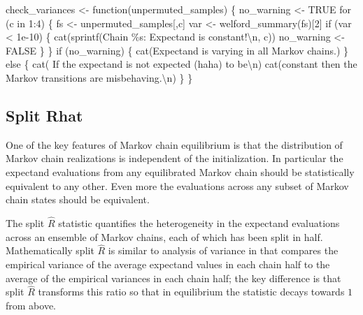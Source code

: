 \documentclass[
  letterpaper,
  DIV=11,
  numbers=noendperiod]{scrartcl}
\newenvironment{Shaded}{\begin{snugshade}}{\end{snugshade}}
\newcommand{\ConstantTok}[1]{\textcolor[rgb]{0.56,0.35,0.01}{#1}}
\newcommand{\ControlFlowTok}[1]{\textcolor[rgb]{0.00,0.23,0.31}{#1}}
\newcommand{\DecValTok}[1]{\textcolor[rgb]{0.68,0.00,0.00}{#1}}
\newcommand{\FloatTok}[1]{\textcolor[rgb]{0.68,0.00,0.00}{#1}}
\newcommand{\FunctionTok}[1]{\textcolor[rgb]{0.28,0.35,0.67}{#1}}
\newcommand{\NormalTok}[1]{\textcolor[rgb]{0.00,0.23,0.31}{#1}}
\newcommand{\OtherTok}[1]{\textcolor[rgb]{0.00,0.23,0.31}{#1}}
\newcommand{\SpecialCharTok}[1]{\textcolor[rgb]{0.37,0.37,0.37}{#1}}
\newcommand{\StringTok}[1]{\textcolor[rgb]{0.13,0.47,0.30}{#1}}
\begin{document}
\begin{Shaded}
\begin{Highlighting}[]
\NormalTok{check\_variances }\OtherTok{\textless{}{-}} \ControlFlowTok{function}\NormalTok{(unpermuted\_samples) \{}
\NormalTok{  no\_warning }\OtherTok{\textless{}{-}} \ConstantTok{TRUE}
  \ControlFlowTok{for}\NormalTok{ (c }\ControlFlowTok{in} \DecValTok{1}\SpecialCharTok{:}\DecValTok{4}\NormalTok{) \{}
\NormalTok{    fs }\OtherTok{\textless{}{-}}\NormalTok{ unpermuted\_samples[,c]}
\NormalTok{    var }\OtherTok{\textless{}{-}} \FunctionTok{welford\_summary}\NormalTok{(fs)[}\DecValTok{2}\NormalTok{]}
    \ControlFlowTok{if}\NormalTok{ (var }\SpecialCharTok{\textless{}} \FloatTok{1e{-}10}\NormalTok{) \{}
      \FunctionTok{cat}\NormalTok{(}\FunctionTok{sprintf}\NormalTok{(}\StringTok{\textquotesingle{}Chain \%s: Expectand is constant!}\SpecialCharTok{\textbackslash{}n}\StringTok{\textquotesingle{}}\NormalTok{, c))}
\NormalTok{      no\_warning }\OtherTok{\textless{}{-}} \ConstantTok{FALSE}
\NormalTok{    \}}
\NormalTok{  \}}
  \ControlFlowTok{if}\NormalTok{ (no\_warning) \{}
    \FunctionTok{cat}\NormalTok{(}\StringTok{\textquotesingle{}Expectand is varying in all Markov chains.\textquotesingle{}}\NormalTok{)}
\NormalTok{  \} }\ControlFlowTok{else}\NormalTok{ \{}
    \FunctionTok{cat}\NormalTok{(}\StringTok{\textquotesingle{}  If the expectand is not expected (haha) to be}\SpecialCharTok{\textbackslash{}n}\StringTok{\textquotesingle{}}\NormalTok{)}
    \FunctionTok{cat}\NormalTok{(}\StringTok{\textquotesingle{}constant then the Markov transitions are misbehaving.}\SpecialCharTok{\textbackslash{}n}\StringTok{\textquotesingle{}}\NormalTok{)}
\NormalTok{  \}}
\NormalTok{\}}
\end{Highlighting}
\end{Shaded}

\hypertarget{split-rhat}{%
\subsection{Split Rhat}\label{split-rhat}}

One of the key features of Markov chain equilibrium is that the
distribution of Markov chain realizations is independent of the
initialization. In particular the expectand evaluations from any
equilibrated Markov chain should be statistically equivalent to any
other. Even more the evaluations across any subset of Markov chain
states should be equivalent.

The split \(\hat{R}\) statistic quantifies the heterogeneity in the
expectand evaluations across an ensemble of Markov chains, each of which
has been split in half. Mathematically split \(\hat{R}\) is similar to
analysis of variance in that compares the empirical variance of the
average expectand values in each chain half to the average of the
empirical variances in each chain half; the key difference is that split
\(\hat{R}\) transforms this ratio so that in equilibrium the statistic
decays towards \(1\) from above.
\end{document}
